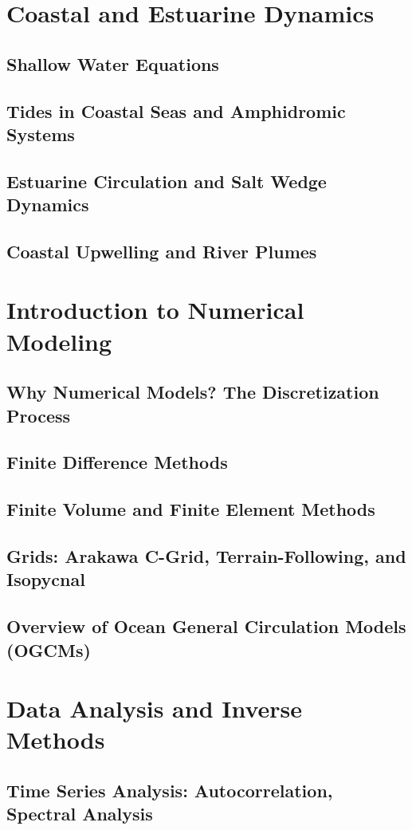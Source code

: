 \documentclass[12pt]{book}
\begin{document}
\chapter{Coastal and Estuarine Dynamics}
\section{Shallow Water Equations}
\section{Tides in Coastal Seas and Amphidromic Systems}
\section{Estuarine Circulation and Salt Wedge Dynamics}
\section{Coastal Upwelling and River Plumes}

\chapter{Introduction to Numerical Modeling}
\section{Why Numerical Models? The Discretization Process}
\section{Finite Difference Methods}
\section{Finite Volume and Finite Element Methods}
\section{Grids: Arakawa C-Grid, Terrain-Following, and Isopycnal}
\section{Overview of Ocean General Circulation Models (OGCMs)}

\chapter{Data Analysis and Inverse Methods}
\section{Time Series Analysis: Autocorrelation, Spectral Analysis}
\end{document}
